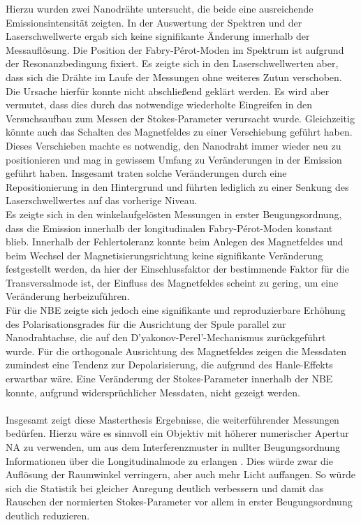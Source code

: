 Hierzu wurden zwei Nanodrähte untersucht, die beide eine ausreichende Emissionsintensität zeigten. In der Auswertung der Spektren und der Laserschwellwerte ergab sich keine signifikante Änderung innerhalb der Messauflösung. Die Position der Fabry-Pérot-Moden im Spektrum ist aufgrund der Resonanzbedingung fixiert. Es zeigte sich in den Laserschwellwerten aber, dass sich die Drähte im Laufe der Messungen ohne weiteres Zutun verschoben. Die Ursache hierfür konnte nicht abschließend geklärt werden. Es wird aber vermutet, dass dies durch das notwendige wiederholte Eingreifen in den Versuchsaufbau zum Messen der Stokes-Parameter verursacht wurde. Gleichzeitig könnte auch das Schalten des Magnetfeldes zu einer Verschiebung geführt haben. Dieses Verschieben machte es notwendig, den Nanodraht immer wieder neu zu positionieren und mag in gewissem Umfang zu Veränderungen in der Emission geführt haben. Insgesamt traten solche Veränderungen durch eine Repositionierung in den Hintergrund und führten lediglich zu einer Senkung des Laserschwellwertes auf das vorherige Niveau.\\
Es zeigte sich in den winkelaufgelösten Messungen in erster Beugungsordnung, dass die Emission innerhalb der longitudinalen Fabry-Pérot-Moden konstant blieb. Innerhalb der Fehlertoleranz konnte beim Anlegen des Magnetfeldes und beim Wechsel der Magnetisierungsrichtung keine signifikante Veränderung festgestellt werden, da hier der Einschlussfaktor der bestimmende Faktor für die Transversalmode ist, der Einfluss des Magnetfeldes scheint zu gering, um eine Veränderung herbeizuführen.\\
Für die NBE zeigte sich jedoch eine signifikante und reproduzierbare Erhöhung des Polarisationsgrades für die Ausrichtung der Spule parallel zur Nanodrahtachse, die auf den D'yakonov-Perel'-Mechanismus zurückgeführt wurde. Für die orthogonale Ausrichtung des Magnetfeldes zeigen die Messdaten zumindest eine Tendenz zur Depolarisierung, die aufgrund des Hanle-Effekts erwartbar wäre. Eine Veränderung der Stokes-Parameter innerhalb der NBE konnte, aufgrund widersprüchlicher Messdaten, nicht gezeigt werden.\\\\
Insgesamt zeigt diese Masterthesis Ergebnisse, die weiterführender Messungen bedürfen. Hierzu wäre es sinnvoll ein Objektiv mit höherer numerischer Apertur NA zu verwenden, um aus dem Interferenzmuster in nullter Beugungsordnung Informationen über die Longitudinalmode zu erlangen \cite{Saxena.2015}. Dies würde zwar die Auflösung der Raumwinkel verringern, aber auch mehr Licht auffangen. So würde sich die Statistik bei gleicher Anregung deutlich verbessern und damit das Rauschen der normierten Stokes-Parameter vor allem in erster Beugungsordnung deutlich reduzieren.\\
